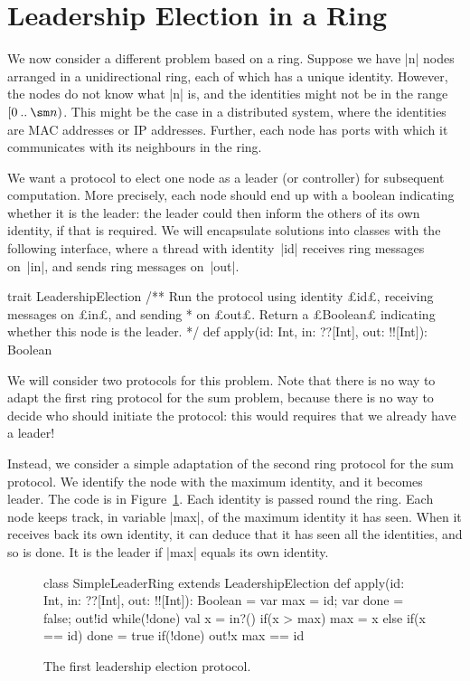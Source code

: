 \section{Leadership Election in a Ring}

We now consider a different problem based on a ring.  Suppose we have |n|
nodes arranged in a unidirectional ring, each of which has a unique identity.
However, the nodes do not know what |n| is, and the identities might not be in
the range $\interval{0}{\sm n}$.  This might be the case in a distributed
system, where the identities are MAC addresses or IP addresses.  Further, each
node has ports with which it communicates with its neighbours in the ring.

We want a protocol to elect one node as a leader
(or controller) for subsequent computation.  More precisely, each node should
end up with a boolean indicating whether it is the leader: the leader could
then inform the others of its own identity, if that is required.  We will
encapsulate solutions into classes with the following interface, where a
thread with identity~|id| receives ring messages on~|in|, and sends ring
messages on~|out|. 
%
\begin{scala}
trait LeadershipElection{
  /** Run the protocol using identity £id£, receiving messages on £in£, and sending 
    * on £out£.  Return a £Boolean£ indicating whether this node is the leader. */
  def apply(id: Int, in: ??[Int], out: !![Int]): Boolean
}
\end{scala}
%


We will consider two protocols for this problem. 
Note that there is no way to adapt the first ring protocol for the sum
problem, because there is no way to decide who should initiate the protocol:
this would requires that we already have a leader! 


Instead, we consider a simple adaptation of the second ring protocol for the
sum protocol.  We identify the node with the maximum identity, and it becomes
leader.  The code is in Figure~\ref{fig:leadership1}.  Each identity is passed
round the ring.  Each node keeps track, in variable |max|, of the maximum
identity it has seen.  When it receives back its own identity, it can deduce
that it has seen all the identities, and so is done.  It is the leader if
|max| equals its own identity.


\begin{figure}[htbp]
\begin{scala}
class SimpleLeaderRing extends LeadershipElection{
  def apply(id: Int, in: ??[Int], out: !![Int]): Boolean = {
    var max = id; var done = false; out!id
    while(!done){
      val x = in?()
      if(x > max) max = x
      else if(x == id) done = true
      if(!done) out!x    
    }
    max == id
  }
}
\end{scala}
\caption{The first leadership election protocol.}
\label{fig:leadership1}
\end{figure}

